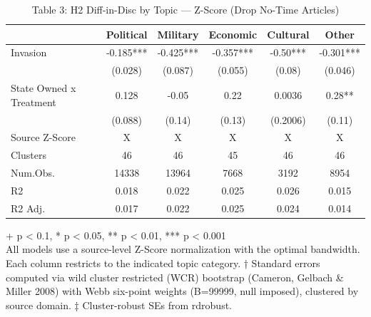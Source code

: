 \begin{table}[t]
\caption{\label{tab:table-03}Table 3: H2 Diff-in-Disc by Topic — Z-Score (Drop No-Time Articles)} 
\fontsize{12.0pt}{14.0pt}\selectfont
\begin{tabular*}{\linewidth}{@{\extracolsep{\fill}}lccccc}
\toprule
  & Political & Military & Economic & Cultural & Other \\ 
\midrule\addlinespace[2.5pt]
Invasion & -0.185*** & -0.425*** & -0.357*** & -0.50*** & -0.301*** \\ 
 & (0.028) & (0.087) & (0.055) & (0.08) & (0.046) \\ 
State Owned x Treatment & 0.128 & -0.05 & 0.22 & 0.0036 & 0.28** \\ 
{} & {(0.088)} & {(0.14)} & {(0.13)} & {(0.2006)} & {(0.11)} \\ 
Source Z-Score & X & X & X & X & X \\ 
Clusters & 46 & 46 & 45 & 46 & 46 \\ 
Num.Obs. & 14338 & 13964 & 7668 & 3192 & 8954 \\ 
R2 & 0.018 & 0.022 & 0.025 & 0.026 & 0.015 \\ 
R2 Adj. & 0.017 & 0.022 & 0.025 & 0.024 & 0.014 \\ 
\bottomrule
\end{tabular*}
\begin{minipage}{\linewidth}
\vspace{.05em}
+ p < 0.1, * p < 0.05, ** p < 0.01, *** p < 0.001\\
All models use a source-level Z-Score normalization with the optimal bandwidth.
Each column restricts to the indicated topic category. † Standard errors
computed via wild cluster restricted (WCR) bootstrap (Cameron, Gelbach \& Miller
2008) with Webb six-point weights (B=99999, null imposed), clustered by source
domain. ‡ Cluster-robust SEs from rdrobust.\\
\end{minipage}
\end{table}

